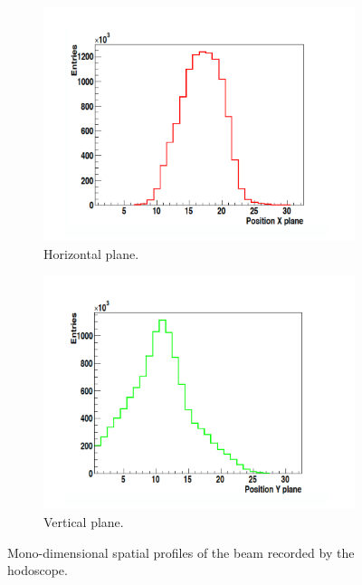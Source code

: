 \begin{figure}
\begin{subfigure}[t]{.5\textwidth}
\centering
\includegraphics[width=1.1\textwidth]{03_GraphicFiles/chapter6_BeamTests/Nice_May2018/profileX.png}
\caption{Horizontal plane.}
\label{chap6::fig::May_HodoprofX}
\end{subfigure}
\begin{subfigure}[t]{.5\textwidth}
\centering
\includegraphics[width=1.1\textwidth]{03_GraphicFiles/chapter6_BeamTests/Nice_May2018/profileY.png}	
\caption{Vertical plane.}
\label{chap6::fig::May_HodoprofY}
\end{subfigure}
\caption{Mono-dimensional spatial profiles of the beam recorded by the hodoscope.}
\label{chap6::fig::May_Hodoprof1D}
\end{figure}


